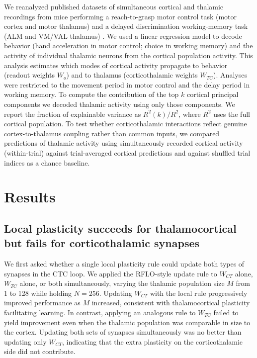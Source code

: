 \documentclass[11pt]{article}
\begin{document}
We reanalyzed published datasets of simultaneous cortical and thalamic
recordings from mice performing a reach-to-grasp motor control task
(motor cortex and motor thalamus) \cite{sauerbrei2020cortical} and a
delayed discrimination working-memory task (ALM and VM/VAL thalamus)
\cite{guo2017maintenance}. We used a linear regression model to decode
behavior (hand acceleration in motor control; choice in working
memory) and the activity of individual thalamic neurons from the
cortical population activity. This analysis estimates which modes of
cortical activity propagate to behavior (readout weights $W_o$) and to
thalamus (corticothalamic weights $W_{TC}$). Analyses were restricted
to the movement period in motor control and the delay period in
working memory. To compute the contribution of the top $k$ cortical
principal components we decoded thalamic activity using only those
components. We report the fraction of explainable variance as
$R^2(k)/R^2$, where $R^2$ uses the full cortical population. To test
whether corticothalamic interactions reflect genuine cortex-to-thalamus
coupling rather than common inputs, we compared predictions of thalamic
activity using simultaneously recorded cortical activity (within-trial)
against trial-averaged cortical predictions and against shuffled trial
indices as a chance baseline.

\section{Results}

\subsection{Local plasticity succeeds for thalamocortical but fails for corticothalamic synapses}
\label{sec:local}

We first asked whether a single local plasticity rule could update
both types of synapses in the CTC loop. We applied the
RFLO-style update rule to $W_{CT}$ alone, $W_{TC}$ alone, or both
simultaneously, varying the thalamic population size $M$ from 1 to 128
while holding $N = 256$. Updating $W_{CT}$ with the local rule
progressively improved performance as $M$ increased, consistent with
thalamocortical plasticity facilitating learning. In contrast,
applying an analogous rule to $W_{TC}$ failed to yield improvement
even when the thalamic population was comparable in size to the
cortex. Updating both sets of synapses simultaneously was no better
than updating only $W_{CT}$, indicating that the extra plasticity on
the corticothalamic side did not contribute.
\end{document}
